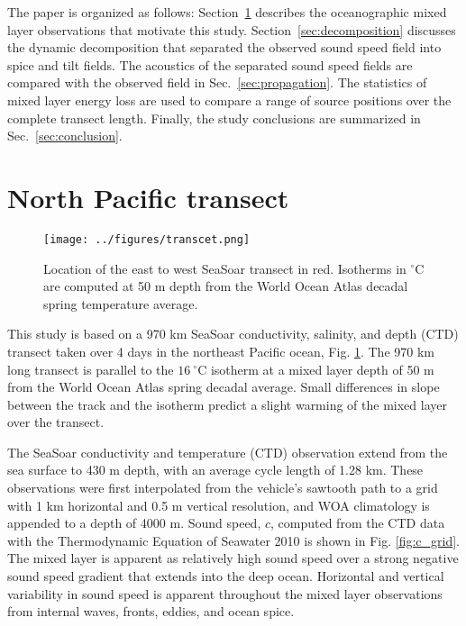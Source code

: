 \documentclass[preprint,NumberedRefs]{JASA}
\begin{document}
The paper is organized as follows: Section~\ref{sec:transcet} describes the oceanographic mixed layer observations that motivate this study. Section~\ref{sec:decomposition} discusses the dynamic decomposition that separated the observed sound speed field into spice and tilt fields. The acoustics of the separated sound speed fields are compared with the observed field in Sec.~\ref{sec:propagation}. The statistics of mixed layer energy loss are used to compare a range of source positions over the complete transect length. Finally, the study conclusions are summarized in Sec.~\ref{sec:conclusion}.

\section{North Pacific transect}\label{sec:transcet}
\begin{figure}
\texttt{[image: ../figures/transcet.png]}
    \caption{\label{fig:transcet}{Location of the east to west SeaSoar transect in red. Isotherms in $^\circ$C are computed at 50 m depth from the World Ocean Atlas decadal spring temperature average\citep{WOA}.}}
\end{figure}

This study is based on a 970 km SeaSoar conductivity, salinity, and depth (CTD) transect taken over 4 days in the northeast Pacific ocean\citep{cole2010seasonal}, Fig. \ref{fig:transcet}. The 970 km long transect is parallel to the $16 \ ^\circ$C isotherm at a mixed layer depth of 50 m from the World Ocean Atlas spring decadal average\citep{WOA}. Small differences in slope between the track and the isotherm predict a slight warming of the mixed layer over the transect.

The SeaSoar conductivity and temperature (CTD) observation\citep{colosi2020observations} extend from the sea surface to 430 m depth, with an average cycle length of 1.28 km. These observations were first interpolated from the vehicle's sawtooth path to a grid with 1 km horizontal and 0.5 m vertical resolution, and WOA climatology is appended to a depth of 4000 m\citep{WOA}. Sound speed, $c$, computed from the CTD data with the Thermodynamic Equation of Seawater 2010\cite{TEOS-10} is shown in Fig. \ref{fig:c_grid}. The mixed layer is apparent as relatively high sound speed over a strong negative sound speed gradient that extends into the deep ocean. Horizontal and vertical variability in sound speed is apparent throughout the mixed layer observations from internal waves, fronts, eddies, and ocean spice\citep{colosi2020observations}.
\end{document}
